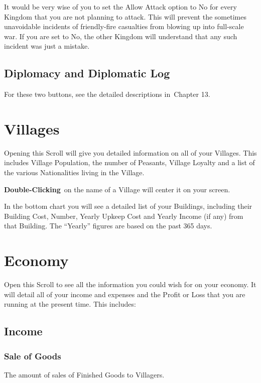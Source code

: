 It would be very wise of you to set the Allow Attack option to No for every Kingdom that you are not planning to attack. This will prevent the sometimes unavoidable incidents of friendly-fire casualties from blowing up into full-scale war. If you are set to No, the other Kingdom will understand that any such incident was just a mistake.

\subsection{Diplomacy and Diplomatic Log}

For these two buttons, see the detailed descriptions in Chapter 13.

\section{Villages}

Opening this Scroll will give you detailed information on all of your Villages. This includes Village Population, the number of Peasants, Village Loyalty and a list of the various Nationalities living in the Village.

\textbf{Double-Clicking} on the name of a Village will center it on your screen.

In the bottom chart you will see a detailed list of your Buildings, including their Building Cost, Number, Yearly Upkeep Cost and Yearly Income (if any) from that Building. The “Yearly” figures are based on the past 365 days.

\section{Economy}

Open this Scroll to see all the information you could wish for on your economy. It will detail all of your income and expenses and the Profit or Loss that you are running at the present time. This includes:

\subsection{Income}

\subsubsection{Sale of Goods}

The amount of sales of Finished Goods to Villagers.

